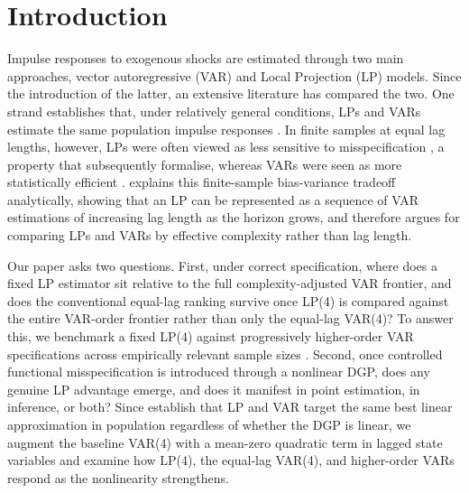 

\section{Introduction}
Impulse responses to exogenous shocks are estimated through two main approaches, 
vector autoregressive (VAR) and Local Projection (LP) models. Since the introduction of the 
latter, an extensive literature has compared the two. One strand establishes that, under 
relatively general conditions, LPs and VARs estimate the same population impulse responses 
\parencite{plagborg2021local, fusari2026more}. In finite samples at equal lag lengths, 
however, LPs were often viewed as less sensitive to misspecification 
\parencite{jorda2005estimation, ramey2016macroeconomic}, a property that 
\textcite{olea2024double} subsequently formalise, whereas VARs were seen as more 
statistically efficient \parencite{li2024local, olea2025local}. \textcite{ludwig2026local} 
explains this finite-sample bias-variance tradeoff analytically, showing that an LP can be 
represented as a sequence of VAR estimations of increasing lag length as the horizon grows, 
and therefore argues for comparing LPs and VARs by effective complexity rather than lag length.

Our paper asks two questions. First, under correct specification, where does a fixed LP 
estimator sit relative to the full complexity-adjusted VAR frontier, and does the conventional 
equal-lag ranking survive once LP(4) is compared against the entire 
VAR-order frontier rather than only the equal-lag VAR(4)? To answer this, we benchmark a 
fixed LP(4) against progressively higher-order VAR specifications \parencite{de2025long} across 
empirically relevant sample sizes \parencite[see e.g.][]{herbst2024bias}. Second, once 
controlled functional misspecification is introduced through a nonlinear DGP, does any 
genuine LP advantage emerge, and does it manifest in point estimation, in inference, or 
both? Since \textcite{plagborg2021local} establish that LP and VAR target the same best 
linear approximation in population regardless of whether the DGP is linear, we augment the 
baseline VAR(4) with a mean-zero quadratic term in lagged state variables and examine how 
LP(4), the equal-lag VAR(4), and higher-order VARs respond as the nonlinearity strengthens.

